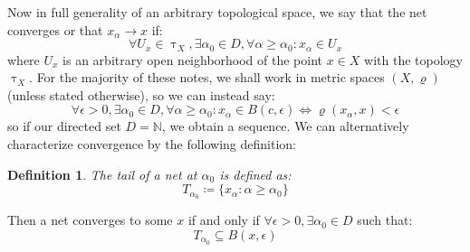 \documentclass[10pt,letterpaper]{article} %
\newtheorem{defn}{Definition}[section]
\begin{document}
Now in full generality of an arbitrary topological space, we say that the net converges or that $x_\alpha \xrightarrow{} x$ if:
\begin{equation*}
\forall U_x \in \uptau_X, \exists \alpha_0 \in D, \forall \alpha \geq \alpha_0: x_\alpha \in U_x
\end{equation*}
where $U_x$ is an arbitrary open neighborhood of the point $x \in X$ with the topology $\uptau_X$. For the majority of these notes, we shall work in metric spaces $(X, \varrho)$ (unless stated otherwise), so we can instead say:
\begin{equation*}
\forall \epsilon > 0, \exists \alpha_0 \in D, \forall \alpha \geq \alpha_0: x_\alpha \in B(c, \epsilon) \iff \varrho(x_\alpha, x) < \epsilon
\end{equation*}
so if our directed set $D = \mathbb{N}$, we obtain a sequence. We can alternatively characterize convergence by the following definition:
\begin{defn}
The tail of a net at $\alpha_0$ is defined as:
\begin{equation*}
T_{\alpha_0} \coloneq \{x_\alpha : \alpha \geq \alpha_0\}
\end{equation*}  
\end{defn}
Then a net converges to some $x$ if and only if $\forall \epsilon > 0, \exists \alpha_0 \in D$ such that:
\begin{equation*}
T_{\alpha_0} \subseteq B(x, \epsilon) 
\end{equation*}
\end{document}
